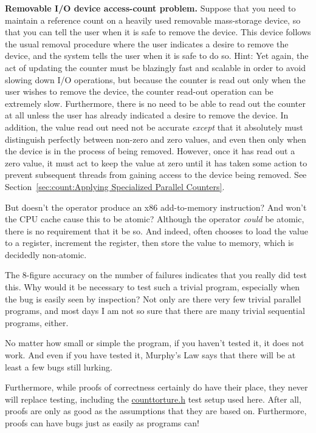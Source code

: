 \QuickQ{}
	{ \bfseries Removable I/O device access-count problem. }
	Suppose that you need to maintain a reference count on a
	heavily used removable mass-storage device, so that you
	can tell the user when it is safe to remove the device.
	This device follows the usual removal procedure where
	the user indicates a desire to remove the device, and
	the system tells the user when it is safe to do so.
\QuickA{}
	Hint: Yet again, the act of updating the counter must be blazingly
	fast and scalable in order to avoid slowing down I/O operations,
	but because the counter is read out only when the
	user wishes to remove the device, the counter read-out
	operation can be extremely slow.
	Furthermore, there is no need to be able to read out
	the counter at all unless the user has already indicated
	a desire to remove the device.
	In addition, the value read out need not be accurate
	\emph{except} that it absolutely must distinguish perfectly
	between non-zero and zero values, and even then only when
	the device is in the process of being removed.
	However, once it has read out a zero value, it must act
	to keep the value at zero until it has taken some action
	to prevent subsequent threads from gaining access to the
	device being removed.
	See Section~\ref{sec:count:Applying Specialized Parallel Counters}.

\QuickQ{}
	But doesn't the \co{++} operator produce an x86 add-to-memory
	instruction?
	And won't the CPU cache cause this to be atomic?
\QuickA{}
	Although the \co{++} operator \emph{could} be atomic, there
	is no requirement that it be so.
	And indeed,  often
	chooses to load the value to a register, increment
	the register, then store the value to memory, which is
	decidedly non-atomic.

\QuickQ{}
	The 8-figure accuracy on the number of failures indicates
	that you really did test this.
	Why would it be necessary to test such a trivial program,
	especially when the bug is easily seen by inspection?
\QuickA{}
	Not only are there very few
	trivial parallel programs, and most days I am
	not so sure that there are many trivial sequential programs, either.

	No matter how small or simple the program, if you haven't tested
	it, it does not work.
	And even if you have tested it, Murphy's Law says that there will
	be at least a few bugs still lurking.

	Furthermore, while proofs of correctness certainly do have their
	place, they never will replace testing, including the
	\url{counttorture.h} test setup used here.
	After all, proofs are only as good as the assumptions that they
	are based on.
	Furthermore, proofs can have bugs just as easily as programs can!

